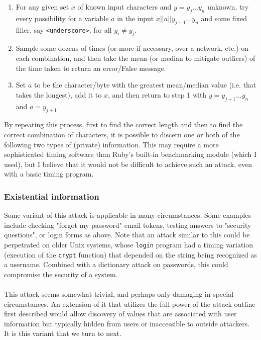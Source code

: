 \documentclass{article}
\providecommand{\tightlist}{
    \setlength{\itemsep}{0pt}\setlength{\parskip}{0pt}
}
\providecommand{\inlinecode}{\texttt}
\begin{document}
\begin{enumerate}\tightlist
  \item For any given set $x$ of known input characters and $y = {y_j \dots y_n}$ unknown, try every possibility for a variable $a$ in the input $x || a || y_{j+1} \dots y_n$ and some fixed filler, say \inlinecode{<underscore>}, for all $y_i \neq y_j$.
  \item Sample some dozens of times (or more if necessary, over a network, etc.) on each combination, and then take the mean (or median to mitigate outliers) of the time taken to return an error/False message.
  \item Set $a$ to be the character/byte with the greatest mean/median value (i.e. that takes the longest), add it to $x$, and then return to step 1 with $y = {y_{j+1} \dots y_n}$ and $a = y_{j+1}$.
\end{enumerate}
By repeating this process, first to find the correct length and then to find the correct combination of characters, it is possible to discern one or both of the following two types of (private) information.
This may require a more sophisticated timing software than Ruby's built-in benchmarking module (which I used), but I believe that it would not be difficult to achieve such an attack, even with a basic timing program.

\subsubsection{Existential information}

Some variant of this attack is applicable in many circumstances. Some examples include checking "forgot my password" email tokens, testing answers to "security questions", or login forms as above. \cite{thisdata} Note that an attack similar to this could be perpetrated on older Unix systems, whose \inlinecode{login} program had a timing variation (execution of the \inlinecode{crypt} function) that depended on the string being recognized as a username. Combined with a dictionary attack on passwords, this could compromise the security of a system. \cite{wikitime} \\
  \\
This attack seems somewhat trivial, and perhaps only damaging in special circumstances. An extension of it that utilizes the full power of the attack outline first described would allow discovery of values that are associated with user information but typically hidden from users or inaccessible to outside attackers. It is this variant that we turn to next.
\end{document}
